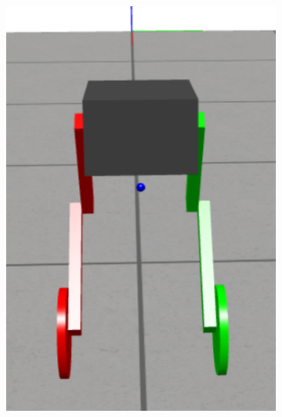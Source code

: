 \begin{figure}[h]
\begin{subfigure}[b]{0.3\textwidth}
        \includegraphics[width=\textwidth]{Simulation Environment_2}
        \label{fig:Simulation Environment_2}
    \end{subfigure}
    \hfill
    \begin{subfigure}[b]{0.3\textwidth}

\end{subfigure}
\end{figure}
